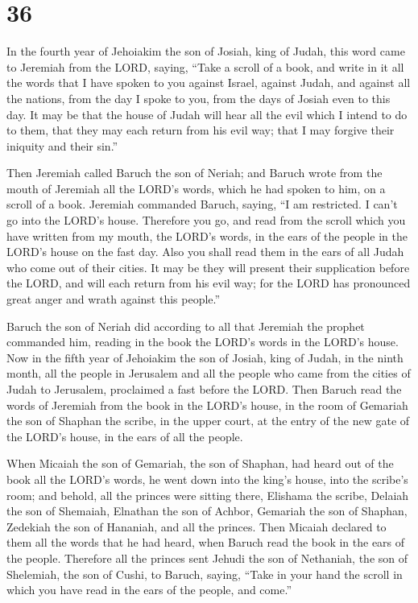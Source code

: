 \hypertarget{section-35}{%
\section{36}\label{section-35}}

 In the fourth year of Jehoiakim the son of Josiah, king of
Judah, this word came to Jeremiah from the LORD, saying, 
``Take a scroll of a book, and write in it all the words that I have
spoken to you against Israel, against Judah, and against all the
nations, from the day I spoke to you, from the days of Josiah even to
this day.  It may be that the house of Judah will hear all
the evil which I intend to do to them, that they may each return from
his evil way; that I may forgive their iniquity and their sin.''

 Then Jeremiah called Baruch the son of Neriah; and Baruch
wrote from the mouth of Jeremiah all the LORD's words, which he had
spoken to him, on a scroll of a book.  Jeremiah commanded
Baruch, saying, ``I am restricted. I can't go into the LORD's house.
 Therefore you go, and read from the scroll which you have
written from my mouth, the LORD's words, in the ears of the people in
the LORD's house on the fast day. Also you shall read them in the ears
of all Judah who come out of their cities.  It may be they
will present their supplication before the LORD, and will each return
from his evil way; for the LORD has pronounced great anger and wrath
against this people.''

 Baruch the son of Neriah did according to all that Jeremiah
the prophet commanded him, reading in the book the LORD's words in the
LORD's house.  Now in the fifth year of Jehoiakim the son of
Josiah, king of Judah, in the ninth month, all the people in Jerusalem
and all the people who came from the cities of Judah to Jerusalem,
proclaimed a fast before the LORD.  Then Baruch read the
words of Jeremiah from the book in the LORD's house, in the room of
Gemariah the son of Shaphan the scribe, in the upper court, at the entry
of the new gate of the LORD's house, in the ears of all the people.

 When Micaiah the son of Gemariah, the son of Shaphan, had
heard out of the book all the LORD's words,  he went down
into the king's house, into the scribe's room; and behold, all the
princes were sitting there, Elishama the scribe, Delaiah the son of
Shemaiah, Elnathan the son of Achbor, Gemariah the son of Shaphan,
Zedekiah the son of Hananiah, and all the princes.  Then
Micaiah declared to them all the words that he had heard, when Baruch
read the book in the ears of the people.  Therefore all the
princes sent Jehudi the son of Nethaniah, the son of Shelemiah, the son
of Cushi, to Baruch, saying, ``Take in your hand the scroll in which you
have read in the ears of the people, and come.''


